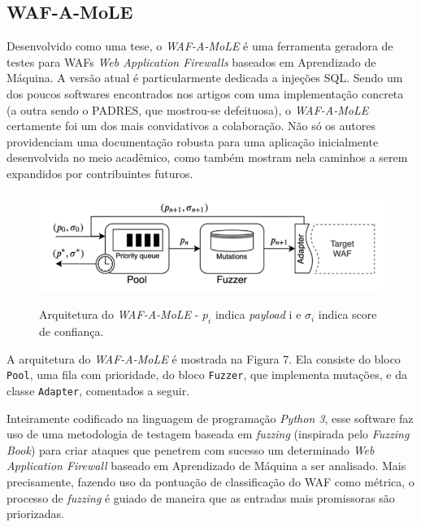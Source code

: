 \subsection{WAF-A-MoLE}

Desenvolvido como uma tese, o \textit{WAF-A-MoLE} \cite{valenza_waf--mole_2020} é uma ferramenta geradora de testes para WAFs \textit{Web Application Firewalls} baseados em Aprendizado de Máquina. A versão atual é particularmente dedicada a injeções SQL. Sendo um dos poucos softwares encontrados nos artigos com uma implementação concreta (a outra sendo o PADRES, que mostrou-se defeituosa), o \textit{WAF-A-MoLE} certamente foi um dos mais convidativos a colaboração. Não só os autores providenciam uma documentação robusta para uma aplicação inicialmente desenvolvida no meio acadêmico, como também mostram nela caminhos a serem expandidos por contribuintes futuros.

\begin{figure}[ht]
    \centering
    \caption{Arquitetura do \textit{WAF-A-MoLE} - $p_i$ indica \textit{payload} i e $\sigma_i$  indica score de confiança.}
    \includegraphics[width=14cm]{figuras/wafamoleArchitecture.png} 
    \label{fig:internet} 
\end{figure}


A arquitetura do \textit{WAF-A-MoLE} é mostrada na Figura 7. Ela consiste do bloco \verb+Pool+, uma fila com prioridade, do bloco \verb+Fuzzer+, que implementa mutações, e da classe \verb+Adapter+, comentados a seguir. 

Inteiramente codificado na linguagem de programação \textit{Python 3}, esse software faz uso de uma metodologia de testagem baseada em \textit{fuzzing} (inspirada pelo \textit{Fuzzing Book}) \cite{fuzzing_book} para criar ataques que penetrem com sucesso um determinado \textit{Web Application Firewall} baseado em Aprendizado de Máquina a ser analisado. Mais precisamente, fazendo uso da pontuação de classificação do WAF como métrica, o processo de \textit{fuzzing} é guiado de maneira que as entradas mais promissoras são priorizadas.

